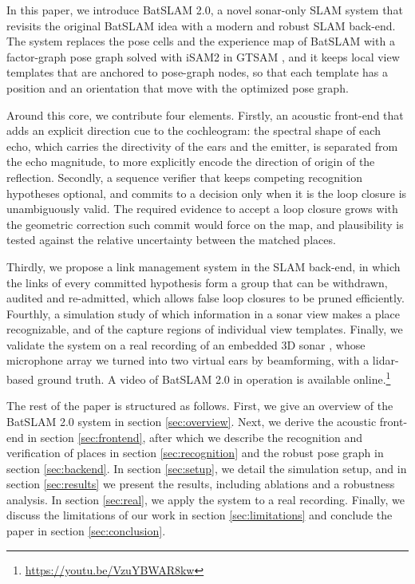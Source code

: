 \documentclass[journal]{IEEEtran}
\begin{document}
In this paper, we introduce BatSLAM 2.0, a novel sonar-only SLAM system that revisits the original BatSLAM idea with a modern and robust SLAM back-end. The system replaces the pose cells and the experience map of BatSLAM with a factor-graph pose graph solved with iSAM2 \cite{kaessISAM2IncrementalSmoothing2012} in GTSAM \cite{dellaertFactorGraphsGTSAM2012}, and it keeps local view templates that are anchored to pose-graph nodes, so that each template has a position and an orientation that move with the optimized pose graph. 

Around this core, we contribute four elements. Firstly, an acoustic front-end that adds an explicit direction cue to the  cochleogram: the spectral shape of each echo, which carries the directivity of the ears and the emitter, is separated from the echo magnitude, to more explicitly encode the direction of origin of the reflection. Secondly, a sequence verifier that keeps competing recognition hypotheses optional, and commits to a decision only when it is the loop closure is unambiguously valid. The required evidence to accept a loop closure grows with the geometric correction such commit would force on the map, and plausibility is tested against the relative uncertainty between the matched places. 

Thirdly, we propose a link management system in the SLAM back-end, in which the links of every committed hypothesis form a group that can be withdrawn, audited and re-admitted, which allows false loop closures to be pruned efficiently. Fourthly, a simulation study of which information in a sonar view makes a place recognizable, and of the capture regions of individual view templates. Finally, we validate the system on a real recording of an embedded 3D sonar \cite{kerstensERTISFullyEmbedded2019}, whose microphone array we turned into two virtual ears by beamforming, with a lidar-based ground truth. A video of BatSLAM 2.0 in operation is available online.\footnote{\label{fn:video}\url{https://youtu.be/VzuYBWAR8kw}}

The rest of the paper is structured as follows. First, we give an overview of the BatSLAM 2.0 system in section \ref{sec:overview}. Next, we derive the acoustic front-end in section \ref{sec:frontend}, after which we describe the recognition and verification of places in section \ref{sec:recognition} and the robust pose graph in section \ref{sec:backend}. In section \ref{sec:setup}, we detail the simulation setup, and in section \ref{sec:results} we present the results, including ablations and a robustness analysis. In section \ref{sec:real}, we apply the system to a real recording. Finally, we discuss the limitations of our work in section \ref{sec:limitations} and conclude the paper in section \ref{sec:conclusion}.
\end{document}
